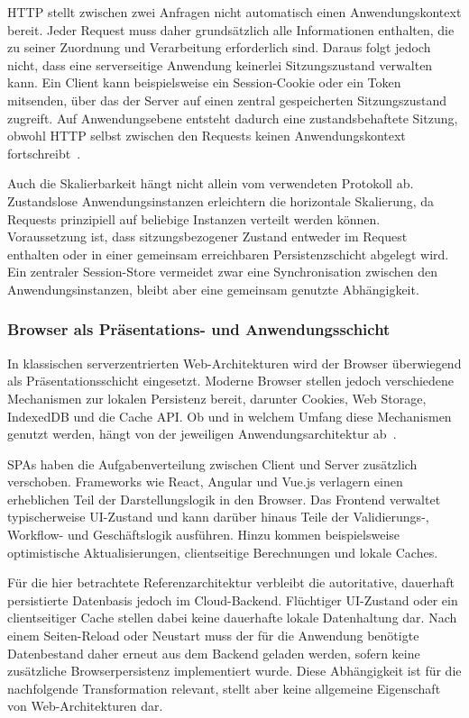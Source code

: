 HTTP stellt zwischen zwei Anfragen nicht automatisch einen Anwendungskontext bereit.
Jeder Request muss daher grundsätzlich alle Informationen enthalten, die zu seiner Zuordnung und Verarbeitung erforderlich sind.
Daraus folgt jedoch nicht, dass eine serverseitige Anwendung keinerlei Sitzungszustand verwalten kann.
Ein Client kann beispielsweise ein Session-Cookie oder ein Token mitsenden, über das der Server auf einen zentral gespeicherten Sitzungszustand zugreift.
Auf Anwendungsebene entsteht dadurch eine zustandsbehaftete Sitzung, obwohl HTTP selbst zwischen den Requests keinen Anwendungskontext fortschreibt~\cite{MDN2026HTTP}.

Auch die Skalierbarkeit hängt nicht allein vom verwendeten Protokoll ab.
Zustandslose Anwendungsinstanzen erleichtern die horizontale Skalierung, da Requests prinzipiell auf beliebige Instanzen verteilt werden können.
Voraussetzung ist, dass sitzungsbezogener Zustand entweder im Request enthalten oder in einer gemeinsam erreichbaren Persistenzschicht abgelegt wird.
Ein zentraler Session-Store vermeidet zwar eine Synchronisation zwischen den Anwendungsinstanzen, bleibt aber eine gemeinsam genutzte Abhängigkeit.

\subsubsection{Browser als Präsentations- und Anwendungsschicht}
In klassischen serverzentrierten Web-Architekturen wird der Browser überwiegend als Präsentationsschicht eingesetzt.
Moderne Browser stellen jedoch verschiedene Mechanismen zur lokalen Persistenz bereit, darunter Cookies, Web Storage, IndexedDB und die Cache API.
Ob und in welchem Umfang diese Mechanismen genutzt werden, hängt von der jeweiligen Anwendungsarchitektur ab~\cite{Wikipedia2026ThinClient}.

SPAs haben die Aufgabenverteilung zwischen Client und Server zusätzlich verschoben.
Frameworks wie React, Angular und Vue.js verlagern einen erheblichen Teil der Darstellungslogik in den Browser.
Das Frontend verwaltet typischerweise UI-Zustand und kann darüber hinaus Teile der Validierungs-, Workflow- und Geschäftslogik ausführen.
Hinzu kommen beispielsweise optimistische Aktualisierungen, clientseitige Berechnungen und lokale Caches.

Für die hier betrachtete Referenzarchitektur verbleibt die autoritative, dauerhaft persistierte Datenbasis jedoch im Cloud-Backend.
Flüchtiger UI-Zustand oder ein clientseitiger Cache stellen dabei keine dauerhafte lokale Datenhaltung dar.
Nach einem Seiten-Reload oder Neustart muss der für die Anwendung benötigte Datenbestand daher erneut aus dem Backend geladen werden, sofern keine zusätzliche Browserpersistenz implementiert wurde.
Diese Abhängigkeit ist für die nachfolgende Transformation relevant, stellt aber keine allgemeine Eigenschaft von Web-Architekturen dar.

